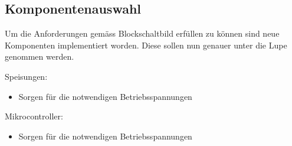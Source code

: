 \subsection{Komponentenauswahl}
\label{subsec:Komponentenauswahl}

Um die Anforderungen gemäss Blockschaltbild erfüllen zu können sind neue Komponenten implementiert worden. Diese sollen nun genauer unter die Lupe genommen werden.

Speisungen: 
\begin{itemize}
\item Sorgen für die notwendigen Betriebsspannungen
\end{itemize}

Mikrocontroller: 
\begin{itemize}
\item Sorgen für die notwendigen Betriebsspannungen
\end{itemize}


